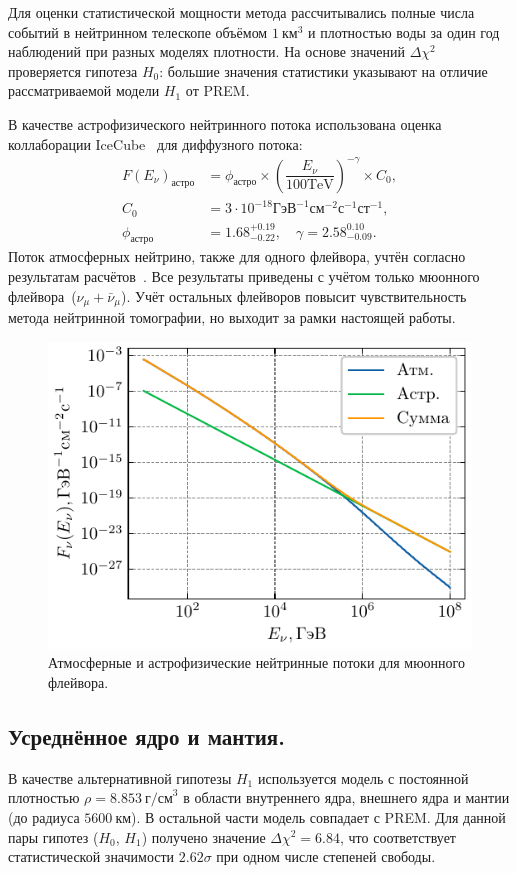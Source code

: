 Для оценки статистической мощности метода рассчитывались полные числа событий в нейтринном телескопе объёмом $1~\text{км}^3$ и плотностью воды за один год наблюдений при разных моделях плотности. На основе значений $\Delta\chi^2$ проверяется гипотеза $H_0$: большие значения статистики указывают на отличие рассматриваемой модели $H_1$ от PREM.

В качестве астрофизического нейтринного потока использована оценка коллаборации IceCube~\cite{Abbasi_2024} для диффузного потока:
\begin{equation}
  \begin{aligned}
    F(E_\nu)_\text{астро} &= \phi_\text{астро}\times \left(\dfrac{E_\nu}{100\text{TeV}}\right)^{-\gamma}\times C_0,\\
    C_0 &= 3\cdot 10^{-18} \text{ГэВ}^{-1} \text{см}^{-2}\text{с}^{-1}\text{ст}^{-1}, \\
    \phi_\text{астро} &=1.68^{+0.19}_{-0.22}, \quad \gamma = 2.58^{0.10}_{-0.09}.
  \end{aligned}
\end{equation}
Поток атмосферных нейтрино,  также  для одного флейвора, учтён согласно результатам расчётов~\cite{sinegovskaya2015}. Все результаты приведены с учётом только мюонного 
флейвора~($\nu_\mu+\bar{\nu}_{\mu}$). Учёт остальных флейворов повысит чувствительность метода нейтринной томографии, но выходит за рамки настоящей работы.
  \begin{figure}[!h]
    \centering
    \includegraphics[width=0.8\linewidth]{images/NuProp/fluxes.pdf}
    \caption{Атмосферные и астрофизические нейтринные потоки для мюонного флейвора.}
    \label{NuFluxes_astro_and_atmo}
  \end{figure}
\subsection*{Усреднённое ядро и мантия.}  
В качестве альтернативной гипотезы $H_1$ используется модель с постоянной плотностью $\rho = 8.853~\text{г/см}^3$ в области внутреннего ядра, внешнего ядра и мантии (до радиуса $5600~\text{км}$).  
В остальной части модель совпадает с PREM.  
Для данной пары гипотез ($H_0$, $H_1$) получено значение $\Delta\chi^2 = 6.84$, что соответствует статистической значимости $2.62\sigma$ при одном числе степеней свободы.
  
